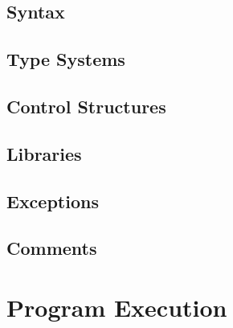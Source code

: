 


\subsection{Syntax}


\subsection{Type Systems}


\subsection{Control Structures}


\subsection{Libraries}


\subsection{Exceptions}


\subsection{Comments}


\toclineskip
\section{Program Execution}


